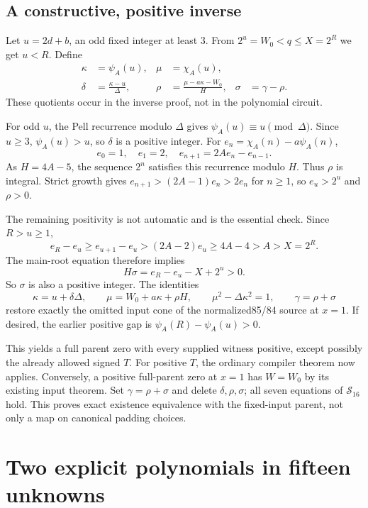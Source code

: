 \documentclass[11pt]{article}
\theoremstyle{remark}\newtheorem{remark}[theorem]{Remark}
\begin{document}
\subsection{A constructive, positive inverse}

Let $u=2d+b$, an odd fixed integer at least $3$. From $2^u=W_0<q\le X=2^R$ we get $u<R$. Define
\begin{align}
 \kappa&=\psi_A(u),&\mu&=\chi_A(u),\nonumber\\
 \delta&=\frac{\kappa-u}{\Delta},&
 \rho&=\frac{\mu-a\kappa-W_0}{H},&
 \sigma&=\gamma-\rho.\label{eq:restore}
\end{align}
These quotients occur in the inverse proof, not in the polynomial circuit.

For odd $u$, the Pell recurrence modulo $\Delta$ gives $\psi_A(u)\equiv u\pmod\Delta$. Since $u\ge3$, $\psi_A(u)>u$, so $\delta$ is a positive integer. For $e_n=\chi_A(n)-a\psi_A(n)$,
\[
 e_0=1,\quad e_1=2,\quad e_{n+1}=2Ae_n-e_{n-1}.
\]
As $H=4A-5$, the sequence $2^n$ satisfies this recurrence modulo $H$. Thus $\rho$ is integral. Strict growth gives $e_{n+1}>(2A-1)e_n>2e_n$ for $n\ge1$, so $e_u>2^u$ and $\rho>0$.

The remaining positivity is not automatic and is the essential check. Since $R>u\ge1$,
\[
 e_R-e_u\ge e_{u+1}-e_u>(2A-2)e_u\ge4A-4>A>X=2^R.
\]
The main-root equation therefore implies
\[
 H\sigma=e_R-e_u-X+2^u>0.
\]
So $\sigma$ is also a positive integer. The identities
\[
 \kappa=u+\delta\Delta,\qquad
 \mu=W_0+a\kappa+\rho H,\qquad
 \mu^2-\Delta\kappa^2=1,\qquad \gamma=\rho+\sigma
\]
restore exactly the omitted input cone of the normalized85/84 source at $x=1$. If desired, the earlier positive gap is $\psi_A(R)-\psi_A(u)>0$.

This yields a full parent zero with every supplied witness positive, except possibly the already allowed signed $T$. For positive $T$, the ordinary compiler theorem now applies. Conversely, a positive full-parent zero at $x=1$ has $W=W_0$ by its existing input theorem. Set $\gamma=\rho+\sigma$ and delete $\delta,\rho,\sigma$; all seven equations of $\mathcal S_{16}$ hold. This proves exact existence equivalence with the fixed-input parent, not only a map on canonical padding choices.

\section{Two explicit polynomials in fifteen unknowns}\label{sec:fifteen}
\end{document}
